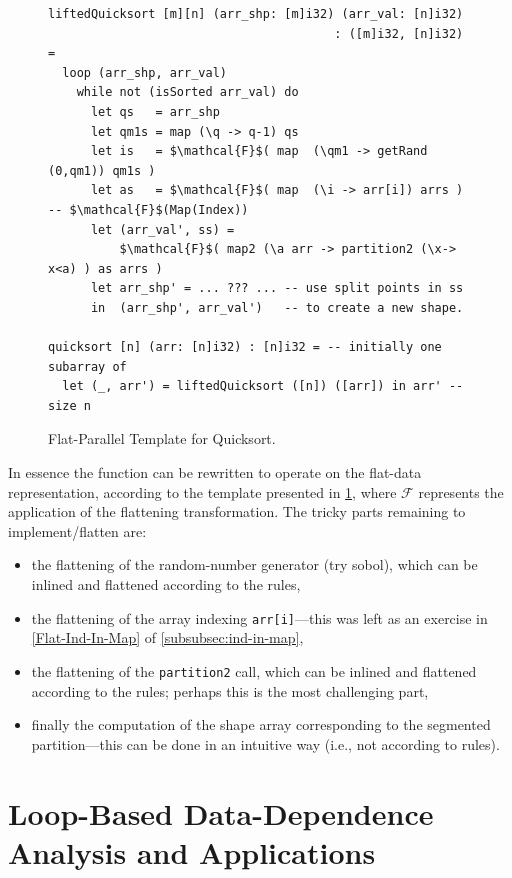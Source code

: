 \documentclass[acmsmall,review]{acmart}\settopmatter{printfolios=true,printccs=false,printacmref=false}
\begin{document}
\begin{figure}
\begin{lstlisting}[mathescape=true]
liftedQuicksort [m][n] (arr_shp: [m]i32) (arr_val: [n]i32) 
                                        : ([m]i32, [n]i32) =
  loop (arr_shp, arr_val) 
    while not (isSorted arr_val) do
      let qs   = arr_shp
      let qm1s = map (\q -> q-1) qs
      let is   = $\mathcal{F}$( map  (\qm1 -> getRand (0,qm1)) qm1s )
      let as   = $\mathcal{F}$( map  (\i -> arr[i]) arrs ) -- $\mathcal{F}$(Map(Index))
      let (arr_val', ss) = 
          $\mathcal{F}$( map2 (\a arr -> partition2 (\x-> x<a) ) as arrs )
      let arr_shp' = ... ??? ... -- use split points in ss 
      in  (arr_shp', arr_val')   -- to create a new shape.

quicksort [n] (arr: [n]i32) : [n]i32 = -- initially one subarray of
  let (_, arr') = liftedQuicksort ([n]) ([arr]) in arr' -- size n
\end{lstlisting}\vspace{-4ex}
\caption{Flat-Parallel Template for Quicksort.}
\label{fig:lifted-flat-quicksort-template}
\end{figure}

In essence the function can be rewritten to operate on the flat-data
representation, according to the template presented in 
\cref{fig:lifted-flat-quicksort-template},
where $\mathcal{F}$ represents the application of the flattening 
transformation. The tricky parts remaining to implement/flatten are:
\begin{itemize}
    \item the flattening of the random-number generator (try sobol),
            which can be inlined and flattened according to the rules,
    \item the flattening of the array indexing {\tt arr[i]}---this 
        was left as an exercise in \cref{Flat-Ind-In-Map} of 
        \cref{subsubsec:ind-in-map},
    \item the flattening of the {\tt partition2} call, which can be 
            inlined and flattened according to the rules; perhaps
            this is the most challenging part,
    \item finally the computation of the shape array corresponding
            to the segmented partition---this can be done in an
            intuitive way (i.e., not according to rules). 
\end{itemize}


\newpage
\section{Loop-Based Data-Dependence Analysis and Applications}
\label{sec:imp-loop-analysis}
\end{document}
